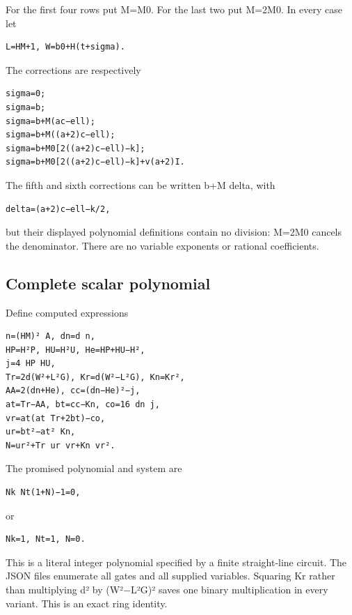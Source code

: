 \documentclass[
  10pt,
]{article}
\begin{document}
For the first four rows put M=M0. For the last two put M=2M0. In every
case let

\begin{verbatim}
L=HM+1, W=b0+H(t+sigma).
\end{verbatim}

The corrections are respectively

\begin{verbatim}
sigma=0;
sigma=b;
sigma=b+M(ac−ell);
sigma=b+M((a+2)c−ell);
sigma=b+M0[2((a+2)c−ell)−k];
sigma=b+M0[2((a+2)c−ell)−k]+v(a+2)I.
\end{verbatim}

The fifth and sixth corrections can be written b+M delta, with

\begin{verbatim}
delta=(a+2)c−ell−k/2,
\end{verbatim}

but their displayed polynomial definitions contain no division: M=2M0
cancels the denominator. There are no variable exponents or rational
coefficients.

\subsection{Complete scalar
polynomial}\label{complete-scalar-polynomial}

Define computed expressions

\begin{verbatim}
n=(HM)² A, dn=d n,
HP=H²P, HU=H²U, He=HP+HU−H²,
j=4 HP HU,
Tr=2d(W²+L²G), Kr=d(W²−L²G), Kn=Kr²,
AA=2(dn+He), cc=(dn−He)²−j,
at=Tr−AA, bt=cc−Kn, co=16 dn j,
vr=at(at Tr+2bt)−co,
ur=bt²−at² Kn,
N=ur²+Tr ur vr+Kn vr².
\end{verbatim}

The promised polynomial and system are

\begin{verbatim}
Nk Nt(1+N)−1=0,
\end{verbatim}

or

\begin{verbatim}
Nk=1, Nt=1, N=0.
\end{verbatim}

This is a literal integer polynomial specified by a finite straight-line
circuit. The JSON files enumerate all gates and all supplied variables.
Squaring Kr rather than multiplying d² by (W²−L²G)² saves one binary
multiplication in every variant. This is an exact ring identity.
\end{document}
